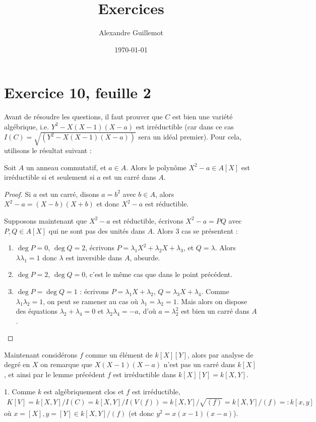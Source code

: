 \documentclass[11pt]{article}
\begin{document}
\title{Exercices}
\date{\today}
\author{Alexandre Guillemot}
\maketitle

\section*{Exercice 10, feuille 2}
Avant de résoudre les questions, il faut prouver que $C$ est bien une variété algébrique, i.e. $Y^2 - X(X-1)(X-a)$ est irréductible (car dans ce cas $I(C) = \sqrt{(Y^2 - X(X-1)(X-a))}$ sera un idéal premier). Pour cela, utilisons le résultat suivant :
\begin{lemm}
    Soit $A$ un anneau commutatif, et $a \in A$. Alors le polynôme $X^2 - a \in A[X]$ est irréductible si et seulement si $a$ est un carré dans $A$.
\end{lemm}
\begin{proof}
    \item Si $a$ est un carré, disons $a = b^2$ avec $b \in A$, alors $X^2 - a = (X - b)(X + b)$ et donc $X^2 - a$ est réductible.
    \item Supposons maintenant que $X^2 - a$ est réductible, écrivons $X^2 - a = PQ$ avec $P,Q \in A[X]$ qui ne sont pas des unités dans $A$. Alors 3 cas se présentent :
    \begin{enumerate}
        \item $\deg P = 0$, $\deg Q = 2$, écrivons $P = \lambda_1X^2 + \lambda_2X + \lambda_3$, et $Q = \lambda$. Alors $\lambda \lambda_1 = 1$ donc $\lambda$ est inversible dans $A$, absurde.
        \item $\deg P = 2$, $\deg Q = 0$, c'est le même cas que dans le point précédent.
        \item $\deg P = \deg Q = 1$ : écrivons $P = \lambda_1X + \lambda_2$, $Q = \lambda_3X + \lambda_4$. Comme $\lambda_1\lambda_2 = 1$, on peut se ramener au cas où $\lambda_1 = \lambda_2 = 1$. Mais alors on dispose des équations $\lambda_2 + \lambda_4 = 0$ et $\lambda_2 \lambda_4 = -a$, d'où $a = \lambda_2^2$ est bien un carré dans $A$.
    \end{enumerate}
\end{proof}
Maintenant considérons $f$ comme un élément de $k[X][Y]$, alors par analyse de degré en $X$ on remarque que $X(X-1)(X-a)$ n'est pas un carré dans $k[X]$, et ainsi par le lemme précédent $f$ est irréductible dans $k[X][Y] = k[X,Y]$.
\begin{question}{1.}
    Comme $k$ est algébriquement clos et $f$ est irréductible,
    \begin{align*}
        K[V] = k[X,Y]/I(C) = k[X,Y]/I(V(f)) = k[X,Y]/\sqrt{(f)} = k[X,Y]/(f) =: k[x,y]
    \end{align*}
    où $x = [X], y = [Y] \in k[X,Y]/(f)$ (et donc $y^2 = x(x-1)(x-a)$).
\end{question}
\end{document}
